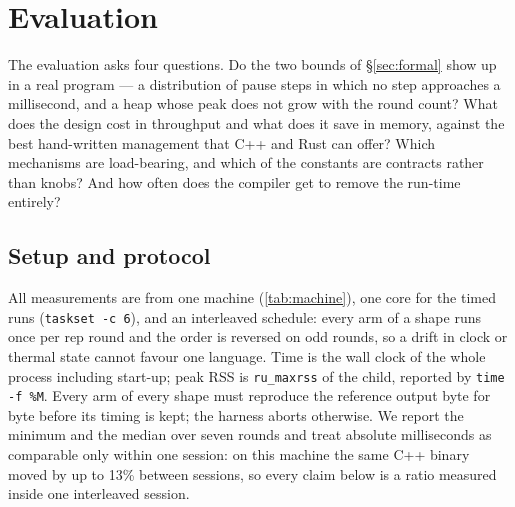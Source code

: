 \section{Evaluation}
\label{sec:eval}

The evaluation asks four questions.  Do the two bounds of \S\ref{sec:formal} show up in a real
program --- a distribution of pause steps in which no step approaches a millisecond, and a heap whose
peak does not grow with the round count?  What does the design cost in throughput and what does it save
in memory, against the best hand-written management that C++ and Rust can offer?  Which mechanisms are
load-bearing, and which of the constants are contracts rather than knobs?  And how often does the
compiler get to remove the run-time entirely?

\subsection{Setup and protocol}
\label{sec:eval-setup}

All measurements are from one machine (\tab\ref{tab:machine}), one core for the timed runs
(\texttt{taskset -c 6}), and an interleaved schedule: every arm of a shape runs once per
rep round and the order is reversed on odd rounds, so a drift in clock or thermal state cannot
favour one language.  Time is the wall clock of the whole process including start-up; peak RSS
is \texttt{ru\_maxrss} of the child, reported by \texttt{time -f \%M}.  Every arm of every
shape must reproduce the reference output byte for byte before its timing is kept; the
harness aborts otherwise.  We report the minimum and the median over seven rounds and treat
absolute milliseconds as comparable only within one session: on this machine the same C++
binary moved by up to 13\% between sessions, so every claim below is a ratio measured inside
one interleaved session.

\begin{table}[t]
\centering
\small
\caption{Machine and toolchains.}
\label{tab:machine}
\end{table}

